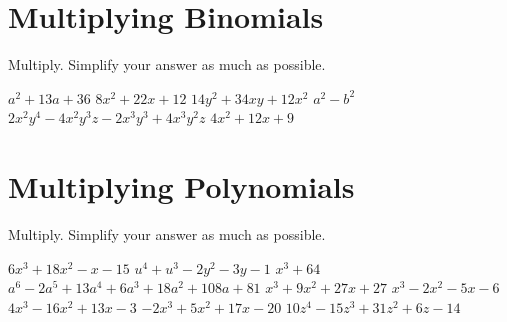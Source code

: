 \section*{Multiplying Binomials}
Multiply. Simplify your answer as much as possible.
\begin{smenum}
\mitemxx
{$a^2+13a+36$}
{$8x^2+22x+12$}
\mitemxx
{$14y^2+34xy+12x^2$}
{$a^2-b^2$}
\mitemxx
{$2x^2y^4-4x^2y^3z-2x^3y^3+4x^3y^2z$}
{$4x^2+12x+9$}
\end{smenum}

\section*{Multiplying Polynomials}
Multiply. Simplify your answer as much as possible.
\begin{smenum}
\mitemxxx
{$6x^3+18x^2-x-15$}
{$u^4+u^3-2y^2-3y-1$}
{$x^3+64$}
\mitemxx
{$a^6-2a^5+13a^4+6a^3+18a^2+108a+81$}
{$x^3+9x^2+27x+27$}
\mitemxx
{$x^3-2x^2-5x-6$}
{$4x^3-16x^2+13x-3$}
\mitemxx
{$-2x^3+5x^2+17x-20$}
{$10z^4-15z^3+31z^2+6z-14$}
\end{smenum}


